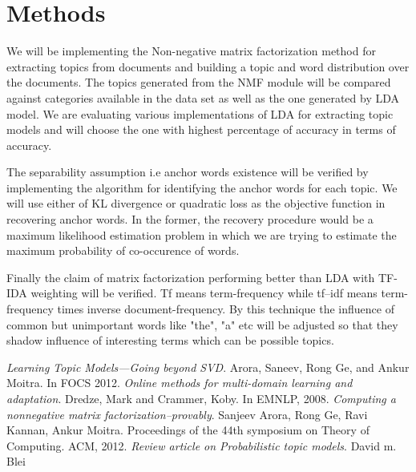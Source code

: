 \documentclass[a4paper,11pt]{article}
\begin{document}
\section{Methods}


We will be implementing the Non-negative matrix factorization method for extracting topics from documents and building a topic and word distribution over the documents. The topics generated from the NMF module will be compared against categories available in the data set as well as the one generated by LDA model. We are evaluating various implementations of LDA for extracting topic models and will choose the one with highest percentage of accuracy in terms of accuracy. 

The separability assumption i.e anchor words existence will be verified by implementing the algorithm for identifying the anchor words for each topic. We will use either of KL divergence or quadratic loss as the objective function in recovering anchor words. In the former, the recovery procedure would be a maximum likelihood estimation problem in which we are trying to estimate the maximum probability of co-occurence of words. 

Finally the claim of matrix factorization performing better than LDA with TF-IDA weighting will be verified. Tf means term-frequency while tf–idf means term-frequency times inverse document-frequency. By this technique the influence of common but unimportant words like "the", "a" etc will be adjusted so that they shadow influence of interesting terms which can be possible topics. 

\begin{thebibliography}{99}
 \textit{Learning Topic Models---Going beyond SVD}. Arora, Saneev, Rong Ge, and Ankur Moitra. In FOCS 2012.
 \textit{Online methods for multi-domain learning and adaptation}. Dredze, Mark and Crammer, Koby. In
EMNLP, 2008.
 \textit{Computing a nonnegative matrix factorization--provably}. Sanjeev Arora, Rong Ge, Ravi Kannan, Ankur Moitra. Proceedings of the 44th symposium on Theory of Computing. ACM, 2012.  
 \textit{Review article on Probabilistic topic models}. David m. Blei  
\end{thebibliography}



\pagebreak
\end{document}
